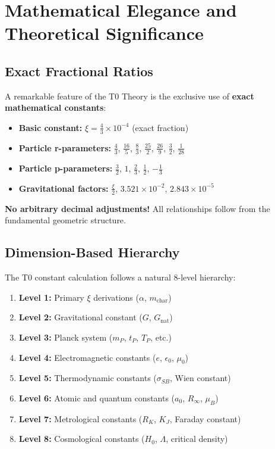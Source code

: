 \documentclass[11pt,a4paper]{article}
\begin{document}
	\section{Mathematical Elegance and Theoretical Significance}
	
	\subsection{Exact Fractional Ratios}
	
	A remarkable feature of the T0 Theory is the exclusive use of \textbf{exact mathematical constants}:
	
	\begin{itemize}
		\item \textbf{Basic constant:} $\xi = \frac{4}{3} \times 10^{-4}$ (exact fraction)
		\item \textbf{Particle r-parameters:} $\frac{4}{3}$, $\frac{16}{5}$, $\frac{8}{3}$, $\frac{25}{2}$, $\frac{26}{9}$, $\frac{3}{2}$, $\frac{1}{28}$
		\item \textbf{Particle p-parameters:} $\frac{3}{2}$, $1$, $\frac{2}{3}$, $\frac{1}{2}$, $-\frac{1}{3}$
		\item \textbf{Gravitational factors:} $\frac{\xi}{2}$, $3{.}521 \times 10^{-2}$, $2{.}843 \times 10^{-5}$
	\end{itemize}
	
	\textcolor{t0green}{\textbf{No arbitrary decimal adjustments!}} All relationships follow from the fundamental geometric structure.
	
	\subsection{Dimension-Based Hierarchy}
	
	The T0 constant calculation follows a natural 8-level hierarchy:
	
	\begin{enumerate}
		\item \textbf{Level 1:} Primary $\xi$ derivations ($\alpha$, $m_{\text{char}}$)
		\item \textbf{Level 2:} Gravitational constant ($G$, $G_{\text{nat}}$)
		\item \textbf{Level 3:} Planck system ($m_P$, $t_P$, $T_P$, etc.)
		\item \textbf{Level 4:} Electromagnetic constants ($e$, $\epsilon_0$, $\mu_0$)
		\item \textbf{Level 5:} Thermodynamic constants ($\sigma_{SB}$, Wien constant)
		\item \textbf{Level 6:} Atomic and quantum constants ($a_0$, $R_\infty$, $\mu_B$)
		\item \textbf{Level 7:} Metrological constants ($R_K$, $K_J$, Faraday constant)
		\item \textbf{Level 8:} Cosmological constants ($H_0$, $\Lambda$, critical density)
	\end{enumerate}
	
\end{document}
